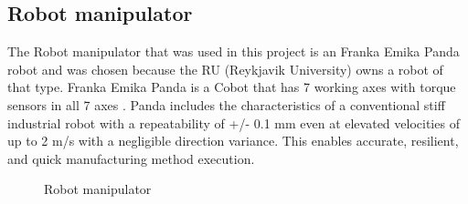 \subsection{Robot manipulator\label{subsec:robot}}
The Robot manipulator that was used in this project is an Franka Emika Panda robot and was chosen because the RU (Reykjavik University) owns a robot of that type. Franka Emika Panda is a Cobot that has 7 working axes with torque sensors in all 7 axes \cite{gmbh_franka_nodate}. Panda includes the characteristics of a conventional stiff industrial robot with a repeatability of +/- 0.1 mm even at elevated velocities of up to 2 m/s with a negligible direction variance. This enables accurate, resilient, and quick manufacturing method execution. 
\begin{figure}[h]
    \centering
    \hfill
    \caption{Robot manipulator}
    \label{figure: frankaemika}
\end{figure}

